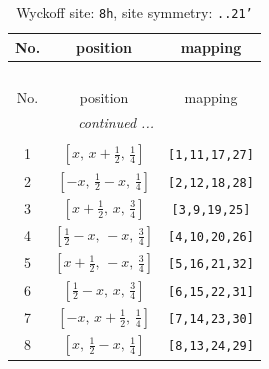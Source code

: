 \documentclass[fleqn,8pt]{jsarticle}
\begin{document}
\begin{longtable}{ccc}
\caption{Wyckoff site: {\tt 8h}, site symmetry: {\tt ..21'}}
 \\
 \hline \hline
No. & position & mapping \\ \hline \endfirsthead

\multicolumn{2}{l}{\tablename\ \thetable{}} \\
 \hline \hline
No. & position & mapping \\ \hline \endhead

 \hline \hline
\multicolumn{2}{r}{\footnotesize\it continued ...} \\ \endfoot

 \hline \hline
\multicolumn{2}{r}{} \\ \endlastfoot

1 & $\left[ x,\, x + \frac{1}{2},\, \frac{1}{4} \right]$ & {\tt [1,11,17,27]} \\ \hline
2 & $\left[ - x,\, \frac{1}{2} - x,\, \frac{1}{4} \right]$ & {\tt [2,12,18,28]} \\ \hline
3 & $\left[ x + \frac{1}{2},\, x,\, \frac{3}{4} \right]$ & {\tt [3,9,19,25]} \\ \hline
4 & $\left[ \frac{1}{2} - x,\, - x,\, \frac{3}{4} \right]$ & {\tt [4,10,20,26]} \\ \hline
5 & $\left[ x + \frac{1}{2},\, - x,\, \frac{3}{4} \right]$ & {\tt [5,16,21,32]} \\ \hline
6 & $\left[ \frac{1}{2} - x,\, x,\, \frac{3}{4} \right]$ & {\tt [6,15,22,31]} \\ \hline
7 & $\left[ - x,\, x + \frac{1}{2},\, \frac{1}{4} \right]$ & {\tt [7,14,23,30]} \\ \hline
8 & $\left[ x,\, \frac{1}{2} - x,\, \frac{1}{4} \right]$ & {\tt [8,13,24,29]} \\
\end{longtable}
\renewcommand{\arraystretch}{1.2}
\end{document}
